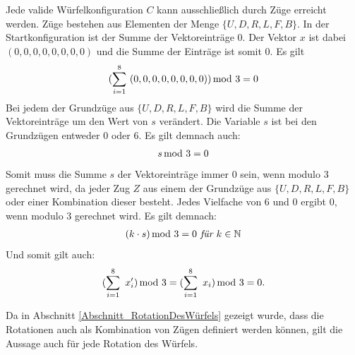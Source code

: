 \documentclass[12pt,a4paper, usenames, dvipsnames]{article}
\theoremstyle{mystyle}
\theoremstyle{definition}
\newcommand{\Gtwo}{\ensuremath{G_{2\times 2\times 2}}}
\begin{document}
Jede valide Würfelkonfiguration $C$ kann ausschließlich durch Züge erreicht werden. Züge bestehen aus Elementen der Menge $\{U, D, R, L, F, B\}$. In der Startkonfiguration ist der Summe der Vektoreinträge $0$. Der Vektor $x$ ist dabei $(0,0,0,0,0,0,0,0)$ und die Summe der Einträge ist somit 0. Es gilt 
\begin{align*}
(\sum_{i= 1}^{8} \ (0,0,0,0,0,0,0,0)) \hspace*{-0.5em} \mod 3 = 0
\end{align*}
Bei jedem der Grundzüge aus $\{U, D, R, L, F, B\}$ wird die Summe der Vektoreinträge um den Wert von $s$ verändert. Die Variable $s$ ist bei den Grundzügen entweder 0 oder 6. Es gilt demnach auch:
\begin{align*}
s \hspace*{-0.5em} \mod 3 = 0
\end{align*}
Somit muss die Summe $s$ der Vektoreinträge immer 0 sein, wenn modulo 3 gerechnet wird, da jeder Zug $Z$ aus einem der Grundzüge aus $\{U, D, R, L, F, B\}$ oder einer Kombination dieser besteht. Jedes Vielfache von 6 und 0 ergibt 0, wenn modulo 3 gerechnet wird. Es gilt demnach:
\begin{align*}
(k \cdot s) \hspace*{-0.5em} \mod 3 = 0 \textit{ für } k \in \mathbb{N}
\end{align*}
Und somit gilt auch:
\begin{align*}
(\sum_{i= 1}^{8} \ x_i') \hspace*{-0.5em} \mod 3 = (\sum_{i= 1}^{8} \  x_i) \hspace*{-0.5em} \mod 3 = 0.
\end{align*}

Da in Abschnitt \ref{Abschnitt_RotationDesWürfels} gezeigt wurde, dass die Rotationen auch als Kombination von Zügen definiert werden können, gilt die Aussage auch für jede Rotation des Würfels.


%
%
%
%
%
%
%
%
%
%
%
%
%
%
%
%
%
%
%
%
\newpage
\end{document}
